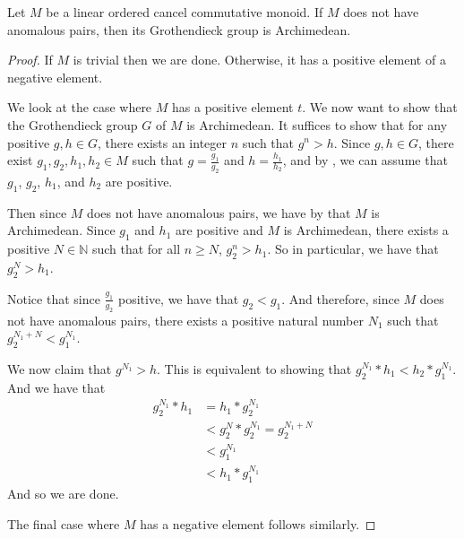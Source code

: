 \begin{theorem}\label{not_anom_to_arch}
    \leanok
    Let $M$ be a linear ordered cancel commutative
    monoid. If $M$ does not have anomalous pairs,
    then its Grothendieck group is Archimedean.
\end{theorem}
\begin{proof}\leanok
If $M$ is trivial then we are done.
Otherwise, it has a positive element of a negative element.

We look at the case where $M$ has a positive element $t$.
We now want to show that the Grothendieck group $G$ of $M$
is Archimedean. It suffices to show that for any positive
$g, h \in G$, there exists an integer $n$ such that $g^n > h$.
Since $g, h \in G$, there exist $g_1,g_2,h_1,h_2 \in M$ such that
$g = \frac{g_1}{g_2}$ and $h = \frac{h_1}{h_2}$, and
by , we can assume that
$g_1$, $g_2$, $h_1$, and $h_2$ are positive.

Then since $M$ does not have anomalous pairs, we have by
 that $M$ is Archimedean.
Since $g_1$ and $h_1$ are positive and $M$ is Archimedean,
there exists a positive $N \in \mathbb{N}$ such that
for all $n \ge N$, $g_2^n > h_1$. So in particular,
we have that $g_2^N > h_1$.

Notice that since $\frac{g_1}{g_2}$ positive, we have that $g_2 < g_1$.
And therefore, since $M$ does not have anomalous pairs, there
exists a positive natural number $N_1$ such that
$g_2^{N_1+N} < g_1^{N_1}$.

We now claim that $g^{N_1} > h$. This is equivalent to
showing that $g_2^{N_1}*h_1 < h_2*g_1^{N_1}$. 
And we have that
\begin{align*}
g_2^{N_1} * h_1 &= h_1 * g_2^{N_1}\\
&< g_2^N * g_2^{N_1} = g_2^{N_1 + N}\\
&< g_1^{N_1} \\
&< h_1 * g_1^{N_1}
\end{align*}
And so we are done.

The final case where $M$ has a negative element
follows similarly.
\end{proof}

